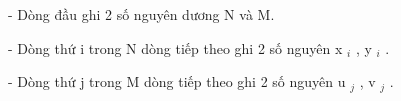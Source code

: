 - Dòng đầu ghi 2 số nguyên dương N và M.  

   - Dòng thứ i trong N dòng tiếp theo ghi 2 số nguyên x   $_    i   $   , y   $_    i   $   .  

   - Dòng thứ j trong M dòng tiếp theo ghi 2 số nguyên u   $_    j   $   , v   $_    j   $   .